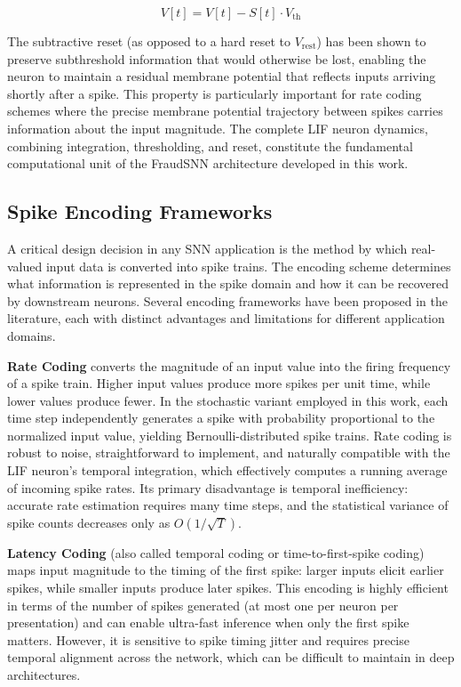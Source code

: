 \begin{equation}
V[t] = V[t] - S[t] \cdot V_{\text{th}}
\label{eq:snn-reset}
\end{equation}

The subtractive reset (as opposed to a hard reset to $V_{\text{rest}}$) has been shown to preserve subthreshold information that would otherwise be lost, enabling the neuron to maintain a residual membrane potential that reflects inputs arriving shortly after a spike. This property is particularly important for rate coding schemes where the precise membrane potential trajectory between spikes carries information about the input magnitude. The complete LIF neuron dynamics, combining integration, thresholding, and reset, constitute the fundamental computational unit of the FraudSNN architecture developed in this work.

\subsection{Spike Encoding Frameworks}

A critical design decision in any SNN application is the method by which real-valued input data is converted into spike trains. The encoding scheme determines what information is represented in the spike domain and how it can be recovered by downstream neurons. Several encoding frameworks have been proposed in the literature, each with distinct advantages and limitations for different application domains.

\textbf{Rate Coding} converts the magnitude of an input value into the firing frequency of a spike train. Higher input values produce more spikes per unit time, while lower values produce fewer. In the stochastic variant employed in this work, each time step independently generates a spike with probability proportional to the normalized input value, yielding Bernoulli-distributed spike trains. Rate coding is robust to noise, straightforward to implement, and naturally compatible with the LIF neuron's temporal integration, which effectively computes a running average of incoming spike rates. Its primary disadvantage is temporal inefficiency: accurate rate estimation requires many time steps, and the statistical variance of spike counts decreases only as $O(1/\sqrt{T})$.

\textbf{Latency Coding} (also called temporal coding or time-to-first-spike coding) maps input magnitude to the timing of the first spike: larger inputs elicit earlier spikes, while smaller inputs produce later spikes. This encoding is highly efficient in terms of the number of spikes generated (at most one per neuron per presentation) and can enable ultra-fast inference when only the first spike matters. However, it is sensitive to spike timing jitter and requires precise temporal alignment across the network, which can be difficult to maintain in deep architectures.

